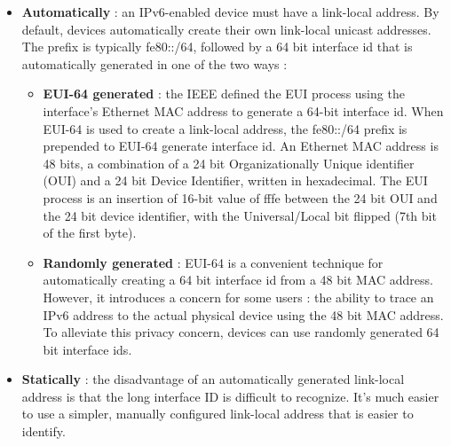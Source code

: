 \documentclass[11pt]{article}
\begin{document}
\begin{itemize}
\begin{itemize}
\item \textbf{Automatically} : an IPv6-enabled device must have a link-local address. By default, devices automatically create their own link-local unicast addresses. The prefix is typically fe80::/64, followed by a 64 bit interface id that is automatically generated in one of the two ways :
\begin{itemize}
\item \textbf{EUI-64 generated} : the IEEE defined the EUI process using the interface's Ethernet MAC address to generate a 64-bit interface id. When EUI-64 is used to create a link-local address, the fe80::/64 prefix is prepended to EUI-64 generate interface id. An Ethernet MAC address is 48  bits, a combination of a 24 bit Organizationally Unique identifier (OUI) and a 24 bit Device Identifier, written in hexadecimal. The EUI process is an insertion of 16-bit value of fffe between the 24 bit OUI and the 24 bit device identifier, with the Universal/Local bit flipped (7th bit of the first byte).       
\item \textbf{Randomly generated} : EUI-64 is a convenient technique for automatically creating a 64 bit interface id from a 48 bit MAC address. However, it introduces a concern for some users : the ability to trace an IPv6 address to the actual physical device using the 48 bit MAC address. To alleviate this privacy concern, devices can use randomly generated 64 bit interface ids.
\end{itemize}
\item \textbf{Statically} : the disadvantage of an automatically generated link-local address is that the long interface ID is difficult to recognize. It's much easier to use a simpler, manually configured link-local address that is easier to identify. 
\end{itemize}
\end{itemize}
\end{document}
